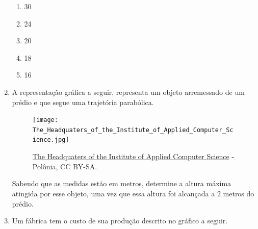 \begin{enumerate}
\begin{figure}[H]
\end{figure}
\begin{enumerate}
\item 30
\item 24
\item 20
\item 18
\item 16
\end{enumerate}

\item A representação gráfica a seguir, representa um objeto arremessado de um prédio e que segue uma trajetória parabólica.

\begin{figure}[H]
\centering
\capstart

\noindent\texttt{[image: The\_Headquaters\_of\_the\_Institute\_of\_Applied\_Computer\_Science.jpg]}
\caption{\href{https://commons.wikimedia.org/wiki/File:The\_Headquaters\_of\_the\_Institute\_of\_Applied\_Computer\_Science.jpg}{The Headquaters of the Institute of Applied Computer Science} - Polônia, CC BY-SA.}\label{\detokenize{AF209-E:id2}}\end{figure}

Sabendo que as medidas estão em metros, determine a altura máxima atingida por esse objeto, uma vez que essa altura foi alcançada a \(2\) metros do prédio.

\item Um fábrica tem o custo de sua produção descrito no gráfico a seguir.
\begin{figure}[H]
\centering

\end{figure}


\end{enumerate}

